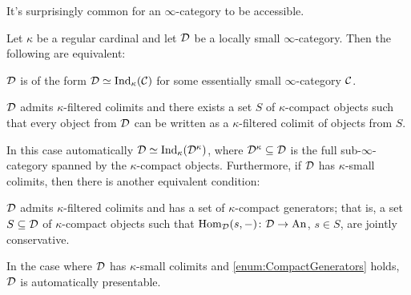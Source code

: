 It's surprisingly common for an $\infty$-category to be accessible.%
\begin{lem}\label{lem:KappaCompactlyGenerated}
	Let $\kappa$ be a regular cardinal and let $\mathcal{D}$ be a locally small $\infty$-category. Then the following are equivalent:
	\begin{alphanumerate}
		\item $\mathcal{D}$ is of the form $\mathcal{D}\simeq \mathrm{Ind}_\kappa(\mathcal{C})$ for some essentially small $\infty$-category $\mathcal{C}$.\label{enum:DIsIndC}
		\item $\mathcal{D}$ admits $\kappa$-filtered colimits and there exists a set $S$ of $\kappa$-compact objects such that every object from $\mathcal{D}$ can be written as a $\kappa$-filtered colimit of objects from $S$.\label{enum:DGeneratedUnderFilteredColimits}
	\end{alphanumerate}
	In this case automatically $\mathcal{D}\simeq \mathrm{Ind}_\kappa(\mathcal{D}^\kappa)$, where $\mathcal{D}^\kappa\subseteq \mathcal{D}$ is the full sub-$\infty$-category spanned by the $\kappa$-compact objects. Furthermore, if $\mathcal{D}$ has $\kappa$-small colimits, then there is another equivalent condition:
	\begin{alphanumerate}[resume]
		\item $\mathcal{D}$ admits $\kappa$-filtered colimits and has a set of $\kappa$-compact generators; that is, a set $S\subseteq \mathcal{D}$ of $\kappa$-compact objects such that $\operatorname{Hom}_{\mathcal{D}}(s,-)\colon \mathcal{D}\rightarrow\mathrm{An}$, $s\in S$, are jointly conservative.\label{enum:CompactGenerators}
	\end{alphanumerate}%
	In the case where $\mathcal{D}$ has $\kappa$-small colimits and \cref{enum:CompactGenerators} holds, $\mathcal{D}$ is automatically presentable.
\end{lem}
